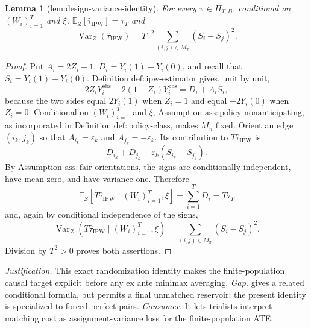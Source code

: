 \documentclass{article}
\newtheorem{lemma}{Lemma}
\begin{document}
\begin{lemma}[lem:design-variance-identity]\label{lem:design-variance-identity}
For every \(\pi\in\Pi_{T,B}\), conditional on \((W_i)_{i=1}^T\) and \(\xi\), \(\mathbb E_Z[\widehat\tau_{\mathrm{IPW}}]=\tau_T\) and \[\operatorname{Var}_Z(\widehat\tau_{\mathrm{IPW}})=T^{-2}\sum_{(i,j)\in M_\pi}(S_i-S_j)^2.\]
\end{lemma}
\begin{proof}
Put \(A_i=2Z_i-1\), \(D_i=Y_i(1)-Y_i(0)\), and recall that \(S_i=Y_i(1)+Y_i(0)\).  Definition \(\mathrm{def:ipw\text{-}estimator}\) gives, unit by unit,
\[
2Z_iY_i^{\mathrm{obs}}-2(1-Z_i)Y_i^{\mathrm{obs}}=D_i+A_iS_i,
\]
because the two sides equal \(2Y_i(1)\) when \(Z_i=1\) and equal \(-2Y_i(0)\) when \(Z_i=0\).  Conditional on \((W_i)_{i=1}^T\) and \(\xi\), Assumption \(\mathrm{ass:policy\text{-}nonanticipating}\), as incorporated in Definition \(\mathrm{def:policy\text{-}class}\), makes \(M_\pi\) fixed.  Orient an edge \((i_k,j_k)\) so that \(A_{i_k}=\varepsilon_k\) and \(A_{j_k}=-\varepsilon_k\).  Its contribution to \(T\widehat\tau_{\mathrm{IPW}}\) is
\[
D_{i_k}+D_{j_k}+\varepsilon_k(S_{i_k}-S_{j_k}).
\]
By Assumption \(\mathrm{ass:fair\text{-}orientations}\), the signs are conditionally independent, have mean zero, and have variance one.  Therefore
\[
\mathbb E_Z[T\widehat\tau_{\mathrm{IPW}}\mid (W_i)_{i=1}^T,\xi]
=\sum_{i=1}^T D_i=T\tau_T
\]
and, again by conditional independence of the signs,
\[
\operatorname{Var}_Z(T\widehat\tau_{\mathrm{IPW}}\mid (W_i)_{i=1}^T,\xi)
=\sum_{(i,j)\in M_\pi}(S_i-S_j)^2.
\]
Division by \(T^2>0\) proves both assertions.
\end{proof}
\par\smallskip\noindent \textit{Justification.} This exact randomization identity makes the finite-population causal target explicit before any ex ante minimax averaging. \textit{Gap.} \cite{morrison2025reservoir} gives a related conditional formula, but permits a final unmatched reservoir; the present identity is specialized to forced perfect pairs. \textit{Consumer.} It lets trialists interpret matching cost as assignment-variance loss for the finite-population ATE.
\end{document}
